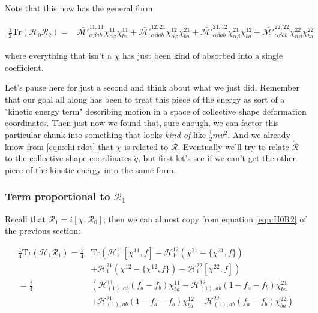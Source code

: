 \noindent Note that this now has the general form

\begin{tcolorbox}
\begin{align}\label{eqn:H0R2_inertia}
\frac{1}{2}\mathrm{Tr}\left(\mathcal{H}_0\mathcal{R}_2\right) = &
 \mathcal{\bar{M'}}^{11,11}_{\alpha\beta ab}\chi^{11}_{\alpha\beta}\chi^{11}_{ba} +
 \mathcal{\bar{M'}}^{12,21}_{\alpha\beta ab}\chi^{12}_{\alpha\beta}\chi^{21}_{ba} +
 \mathcal{\bar{M'}}^{21,12}_{\alpha\beta ab}\chi^{21}_{\alpha\beta}\chi^{12}_{ba} +
 \mathcal{\bar{M'}}^{22,22}_{\alpha\beta ab}\chi^{22}_{\alpha\beta}\chi^{22}_{ba}
\end{align}
\end{tcolorbox}

\noindent where everything that isn't a $\chi$ has just been kind of absorbed into a single coefficient.

Let's pause here for just a second and think about what we just did. Remember that our goal all along has been to treat this piece of the energy as sort of a "kinetic energy term" describing motion in a space of collective shape deformation coordinates. Then just now we found that, sure enough, we can factor this particular chunk into something that looks \textit{kind of} like $\frac{1}{2}mv^2$. And we already know from \ref{eqn:chi-rdot} that $\chi$ is related to $\mathcal{\dot{R}}$. Eventually we'll try to relate $\mathcal{\dot{R}}$ to the collective shape coordinates $\dot{q}$, but first let's see if we can't get the other piece of the kinetic energy into the same form.

\subsubsection{Term proportional to $\mathcal{R}_1$}

Recall that $\mathcal{R}_1 = i\left[\chi, \mathcal{R}_0\right]$; then we can almost copy from equation \ref{eqn:H0R2} of the previous section:

\begin{align}\label{eqn:H1R1}
\frac{1}{4}\mathrm{Tr}\left(\mathcal{H}_{1}\mathcal{R}_{1}\right) = \frac{i}{4}&\mathrm{Tr} \left(\mathcal{H}_{1}^{11}[\chi^{11},f] - \mathcal{H}_{1}^{12}(\chi^{21}-\{\chi^{21},f\}) \right. \\
&\left.+ \mathcal{H}_{1}^{21}(\chi^{12}-\{\chi^{12},f\}) - \mathcal{H}_{1}^{22}[\chi^{22},f]\right) \\
= \frac{i}{4}& \left(\mathcal{H}_{(1),ab}^{11}(f_a-f_b)\chi^{11}_{ba} - \mathcal{H}_{(1),ab}^{12}(1-f_a-f_b)\chi^{21}_{ba} \right. \\
&\left.+ \mathcal{H}_{(1),ab}^{21}(1-f_a-f_b)\chi^{12}_{ba} - \mathcal{H}_{(1),ab}^{22}(f_a-f_b)\chi^{22}_{ba}\right)
\end{align}


